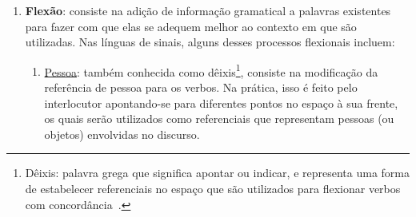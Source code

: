 \begin{enumerate}
\begin{enumerate}


          \end{enumerate}


    \item \textbf{Flexão}: consiste na adição de informação gramatical a palavras existentes para fazer com que elas se adequem melhor ao contexto em que são utilizadas. Nas línguas de sinais, alguns desses processos flexionais incluem:






          \begin{enumerate}
              \item \underline{Pessoa}: também conhecida como dêixis\footnote{
                        Dêixis: palavra grega que significa apontar ou indicar, e representa uma forma de estabelecer referenciais no espaço que são utilizados para flexionar verbos com concordância~\cite{quadros-2004-estudos-linguisticos}.
                    }, consiste na modificação da referência de pessoa para os verbos.
                    Na prática, isso é feito pelo interlocutor apontando-se para diferentes pontos no espaço à sua frente, os quais serão utilizados como referenciais que representam pessoas (ou objetos) envolvidas no discurso.


\end{enumerate}
\end{enumerate}
